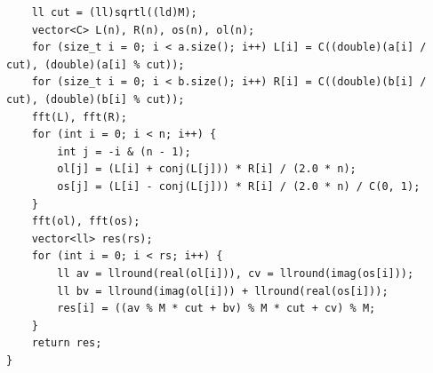 \documentclass[9pt,a4paper,twocolumn]{extarticle}
\begin{document}
\begin{lstlisting}
    ll cut = (ll)sqrtl((ld)M);
    vector<C> L(n), R(n), os(n), ol(n);
    for (size_t i = 0; i < a.size(); i++) L[i] = C((double)(a[i] / cut), (double)(a[i] % cut));
    for (size_t i = 0; i < b.size(); i++) R[i] = C((double)(b[i] / cut), (double)(b[i] % cut));
    fft(L), fft(R);
    for (int i = 0; i < n; i++) {
        int j = -i & (n - 1);
        ol[j] = (L[i] + conj(L[j])) * R[i] / (2.0 * n);
        os[j] = (L[i] - conj(L[j])) * R[i] / (2.0 * n) / C(0, 1);
    }
    fft(ol), fft(os);
    vector<ll> res(rs);
    for (int i = 0; i < rs; i++) {
        ll av = llround(real(ol[i])), cv = llround(imag(os[i]));
        ll bv = llround(imag(ol[i])) + llround(real(os[i]));
        res[i] = ((av % M * cut + bv) % M * cut + cv) % M;
    }
    return res;
}
\end{lstlisting}

\filbreak
\end{document}
